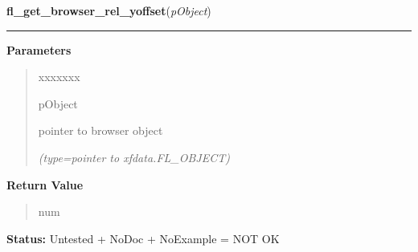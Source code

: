 \hspace{.8\funcindent}\begin{boxedminipage}{\funcwidth}

    \raggedright \textbf{fl\_get\_browser\_rel\_yoffset}(\textit{pObject})

    \vspace{-1.5ex}

    \rule{\textwidth}{0.5\fboxrule}
\setlength{\parskip}{2ex}
\setlength{\parskip}{1ex}
      \textbf{Parameters}
      \vspace{-1ex}

      \begin{quote}
        \begin{Ventry}{xxxxxxx}

          \item[pObject]

          pointer to browser object

            {\it (type=pointer to xfdata.FL\_OBJECT)}

        \end{Ventry}

      \end{quote}

      \textbf{Return Value}
    \vspace{-1ex}

      \begin{quote}
      num

      \end{quote}

\textbf{Status:} Untested + NoDoc + NoExample = NOT OK



    \end{boxedminipage}

    \label{xformslib:library:fl_set_browser_yoffset}

    \vspace{0.5ex}

